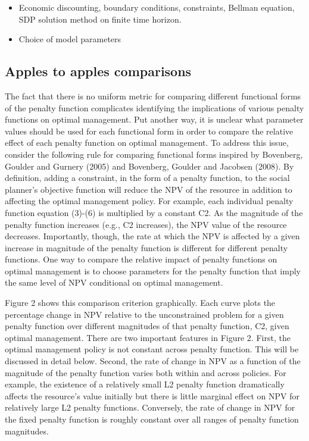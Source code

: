 \documentclass[authoryear, review, 12pt]{elsarticle}
\begin{document}
\begin{itemize}
\item   Economic discounting, boundary conditions, constraints, Bellman equation, SDP solution method on finite time horizon.  
\item   Choice of model parameters 
\end{itemize}


\subsection{Apples to apples comparisons}


The fact that there is no uniform metric for comparing different functional forms of the penalty function complicates identifying the implications of various penalty functions on optimal management.  Put another way, it is unclear what parameter values should be used for each functional form in order to compare the relative effect of each penalty function on optimal management.  
To address this issue, consider the following rule for comparing functional forms inspired by Bovenberg, Goulder and Gurnery (2005) and Bovenberg, Goulder and Jacobsen (2008).  By definition, adding a constraint, in the form of a penalty function, to the social planner’s objective function will reduce the NPV of the resource in addition to affecting the optimal management policy.  For example, each individual penalty function equation (3)-(6) is multiplied by a constant C2.  As the magnitude of the penalty function increases (e.g., C2 increases), the NPV value of the resource decreases.  Importantly, though, the rate at which the NPV is affected by a given increase in magnitude of the penalty function is different for different penalty functions.  One way to compare the relative impact of penalty functions on optimal management is to choose parameters for the penalty function that imply the same level of NPV conditional on optimal management. 

Figure 2 shows this comparison criterion graphically.  Each curve plots the percentage change in NPV relative to the unconstrained problem for a given penalty function over different magnitudes of that penalty function, C2, given optimal management.  There are two important features in Figure 2.  First, the optimal management policy is not constant across penalty function.  This will be discussed in detail below.  Second, the rate of change in NPV as a function of the magnitude of the penalty function varies both within and across policies.  For example, the existence of a relatively small L2 penalty function dramatically affects the resource’s value initially but there is little marginal effect on NPV for relatively large L2 penalty functions.  Conversely, the rate of change in NPV for the fixed penalty function is roughly constant over all ranges of penalty function magnitudes.  
\end{document}
